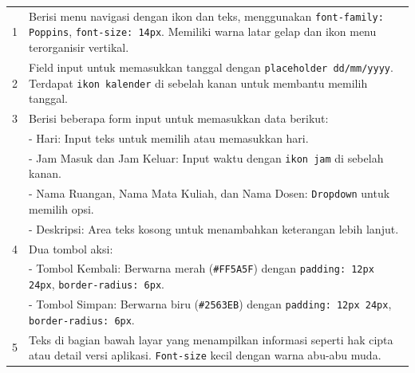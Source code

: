 \begin{enumerate}
{\begin{longtable}{p{4cm} p{9cm}}
		      1                                & Berisi menu navigasi dengan ikon dan teks, menggunakan \texttt{font-family: Poppins}, \texttt{font-size: 14px}. Memiliki warna latar gelap dan ikon menu terorganisir vertikal. \\
		      2                                & Field input untuk memasukkan tanggal dengan \texttt{placeholder dd/mm/yyyy}. Terdapat \texttt{ikon kalender} di sebelah kanan untuk membantu memilih tanggal.                   \\
		      3                                & Berisi beberapa form input untuk memasukkan data berikut:                                                                                                                       \\
		                                       & - Hari: Input teks untuk memilih atau memasukkan hari.                                                                                                                          \\
		                                       & - Jam Masuk dan Jam Keluar: Input waktu dengan \texttt{ikon jam} di sebelah kanan.                                                                                              \\
		                                       & - Nama Ruangan, Nama Mata Kuliah, dan Nama Dosen: \texttt{Dropdown} untuk memilih opsi.                                                                                         \\
		                                       & - Deskripsi: Area teks kosong untuk menambahkan keterangan lebih lanjut.                                                                                                        \\
		      4                                & Dua tombol aksi:                                                                                                                                                                \\
		                                       & - Tombol Kembali: Berwarna merah (\texttt{\#FF5A5F}) dengan \texttt{padding: 12px 24px}, \texttt{border-radius: 6px}.                                                           \\
		                                       & - Tombol Simpan: Berwarna biru (\texttt{\#2563EB}) dengan \texttt{padding: 12px 24px}, \texttt{border-radius: 6px}.                                                             \\
		      5                                & Teks di bagian bawah layar yang menampilkan informasi seperti hak cipta atau detail versi aplikasi. \texttt{Font-size} kecil dengan warna abu-abu muda.                         \\
		      \hline
	      \end{longtable}
	      }
\end{enumerate}
